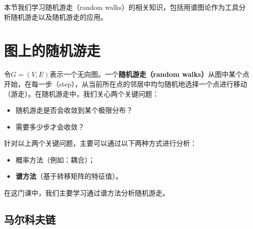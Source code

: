 \providecommand\numberthis{\addtocounter{equation}{1}\tag{\theequation}}

\providecommand{\R}{\mathbb{R}}
\providecommand{\Tr}{\mathrm{Tr}}
\providecommand{\sgn}{\mathrm{sgn}}
\providecommand{\NA}{\mathcal{A}(G)}
\providecommand{\NL}{\mathcal{L}(G)}
\providecommand{\vol}{\mathrm{vol}}
\providecommand{\qf}[2]{{#1}^{\top}{#2}{#1}}
\providecommand{\argmin}{\mathrm{argmin}}

\providecommand*\circled[1]{\tikz[baseline=(char.base)]{
            \node[shape=circle,draw,inner sep=2pt] (char) {#1};}}



本节我们学习随机游走（random walks）的相关知识，包括用谱图论作为工具分析随机游走以及随机游走的应用。


    
    
    
\section{图上的随机游走}

令$G=(V,E)$表示一个无向图。一个\textbf{随机游走（random walks）}从图中某个点开始，在每一步（step），从当前所在点的邻居中均匀随机地选择一个点进行移动（游走）。在随机游走中，我们关心两个关键问题：
\begin{itemize}
    \item 随机游走是否会收敛到某个极限分布？
    \item 需要多少步才会收敛？
\end{itemize}

\vspace{0.3cm}
针对以上两个关键问题，主要可以通过以下两种方式进行分析：
\begin{itemize}
    \item 概率方法（例如：耦合）；
    \item \textbf{谱方法}（基于转移矩阵的特征值）。
\end{itemize}

在这门课中，我们主要学习通过谱方法分析随机游走。



\subsection{马尔科夫链}

